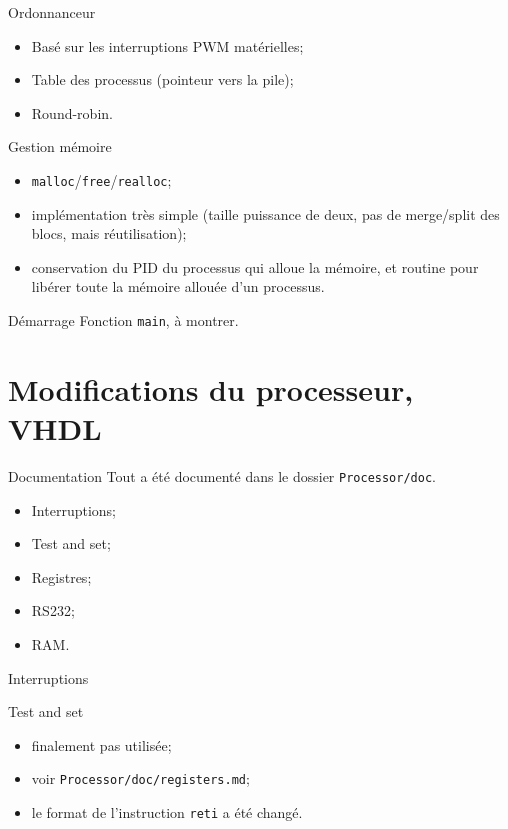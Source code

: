 \documentclass{beamer}
\begin{document}
    \begin{frame}[fragile]{Ordonnanceur}
      \begin{itemize}
        \item Basé sur les interruptions PWM matérielles;
        \item Table des processus (pointeur vers la pile);
        \item Round-robin.
      \end{itemize}
\end{frame}

    \begin{frame}[fragile]{Gestion mémoire}
      \begin{itemize}
        \item \verb+malloc+/\verb+free+/\verb+realloc+;
        \item implémentation très simple (taille puissance de deux, pas de
          merge/split des blocs, mais réutilisation);
        \item conservation du PID du processus qui alloue la mémoire, et routine
          pour libérer toute la mémoire allouée d'un processus.
      \end{itemize}
\end{frame}

    \begin{frame}[fragile]{Démarrage}
        Fonction \verb+main+, à montrer.
\end{frame}

  \section{Modifications du processeur, VHDL}
    \begin{frame}[fragile]{Documentation}
      Tout a été documenté dans le dossier \verb+Processor/doc+.
      \begin{itemize}
        \item Interruptions;
        \item Test and set;
        \item Registres;
        \item RS232;
        \item RAM.
      \end{itemize}
\end{frame}

    \begin{frame}{Interruptions}
    \end{frame}

    \begin{frame}[fragile]{Test and set}
      \begin{itemize}
        \item finalement pas utilisée;
        \item voir \verb+Processor/doc/registers.md+;
        \item le format de l'instruction \verb+reti+ a été changé.
      \end{itemize}
\end{frame}
\end{document}

